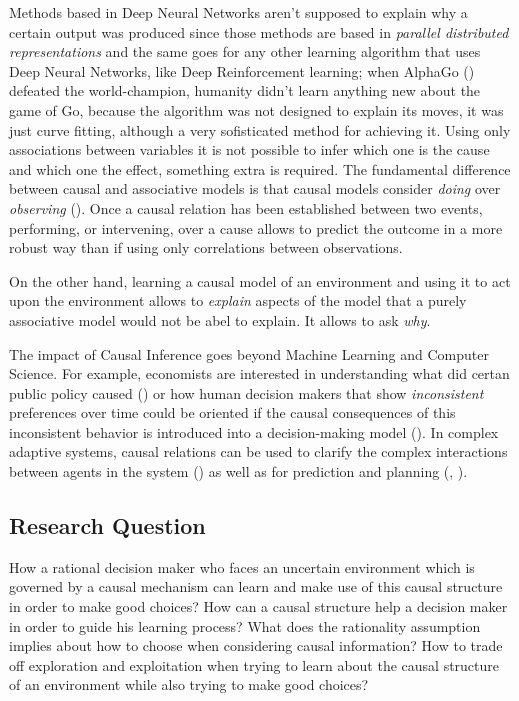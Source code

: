 \documentclass[english,letterpaper,12pt,final]{article}
\theoremstyle{definition}
\begin{document}
	Methods based in Deep Neural Networks aren't supposed to explain why a certain output was produced since those methods are based in \textit{parallel distributed representations} and the same goes for any other learning algorithm that uses Deep Neural Networks, like Deep Reinforcement learning; when AlphaGo (\cite{silver2017mastering}) defeated the world-champion, humanity didn't learn anything new about the game of Go, because the algorithm was not designed to explain its moves, it was just curve fitting, although a very sofisticated method for achieving it. Using only associations between variables it is not possible to infer which one is the cause and which one the effect, something extra is required. The fundamental difference between causal and associative models is that causal models consider \textit{doing} over \textit{observing} (\cite{pearl2018why}). Once a causal relation has been established between two events, performing, or intervening, over a cause allows to predict the outcome in a more robust way than if using only correlations between observations. 
	
	On the other hand, learning a causal model of an environment and using it to act upon the environment allows to \textit{explain} aspects of the model that a purely associative model would not be abel to explain. It allows to ask \textit{why}.
	
	The impact of Causal Inference goes beyond Machine Learning and Computer Science. For example, economists are interested in understanding what did certan public policy caused (\cite{athey2017impact}) or how human decision makers that show \textit{inconsistent} preferences over time could be oriented if the causal consequences of this inconsistent behavior is introduced into a decision-making model (\cite{albers2016motivating}). In complex adaptive systems, causal relations can be used to clarify the complex interactions between agents in the system (\cite{abbott2017complex}) as well as for prediction and planning (\cite{hunt2016ants}, \cite{brock2018causality}).
	
	\subsection{Research Question}
How a rational decision maker who faces an uncertain environment which is governed by a causal mechanism can learn and make use of this causal structure in order to make good choices? How can a causal structure help a decision maker in order to guide his learning process? What does the rationality assumption implies about how to choose when considering causal information? How to trade off exploration and exploitation when trying to learn about the causal structure of an environment while also trying to make good choices?
\end{document}
